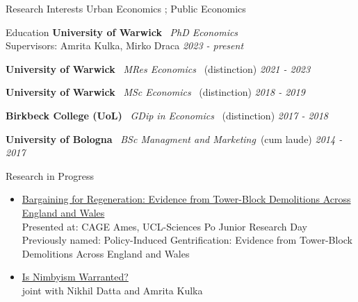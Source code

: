 \documentclass{cv_EB}
\begin{document}

\begin{rSection}{Research Interests}
	\smallskip
	Urban Economics ; Public Economics
\end{rSection}



%
%
%




\begin{rSection}{Education}
\smallskip
{\bf University of Warwick} \ {\em PhD Economics} \\ {Supervisors: Amrita Kulka, Mirko Draca}  \hfill {\em 2023 - present}

{\bf University of Warwick} \ {\em MRes Economics} \ {(distinction)} \hfill {\em 2021 - 2023} 

{\bf University of Warwick} \ {\em MSc Economics} \ {(distinction)} \hfill {\em 2018 - 2019} 

{\bf Birkbeck College (UoL)} \ {\em GDip in Economics} \ {(distinction)} \hfill {\em 2017 - 2018} 

{\bf University of Bologna} \ {\em BSc Managment and Marketing}\ {(cum laude)} \hfill {\em 2014 - 2017} 

\end{rSection}


\begin{rSection}{Research in Progress}
\smallskip

\begin{itemize}[leftmargin=0em]
	
	\item \href{}{Bargaining for Regeneration: Evidence from Tower-Block Demolitions Across England and Wales} \hspace{0.5em}
	\\ {\scriptsize Presented at: CAGE Ames, UCL-Sciences Po Junior Research Day}
  \\ {\scriptsize Previously named: Policy-Induced Gentrification: Evidence from Tower-Block Demolitions Across England and Wales}

\medskip
		
\item \href{}{Is Nimbyism Warranted?}
\\ {\small joint with Nikhil Datta and Amrita Kulka}
 


\end{itemize}

\end{rSection}
\end{document}
